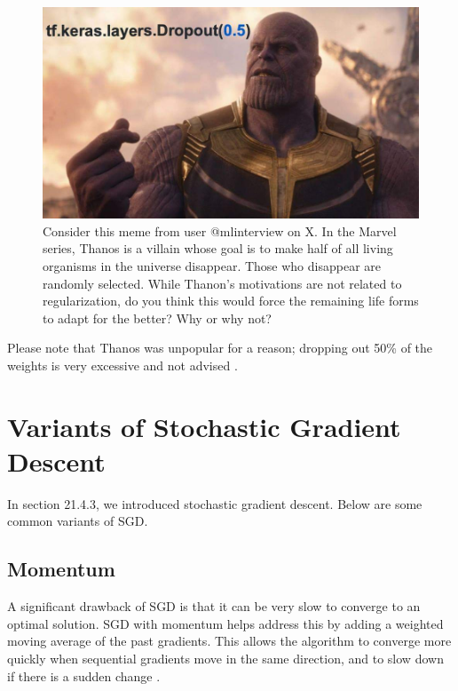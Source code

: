 \documentclass{article}
\begin{document}
\begin{figure}[h]
    \centering
    \includegraphics[scale = 0.24]{dl-figures/thanos-dropout-meme.jpg}
    \caption{Consider this meme from user @mlinterview on X. In the Marvel series, Thanos is a villain whose goal is to make half of all living organisms in the universe disappear. Those who disappear are randomly selected. While Thanon's motivations are not related to regularization, do you think this would force the remaining life forms to adapt for the better? Why or why not?}
    \label{figure:thanos-dropout-meme}
\end{figure}

\FloatBarrier

Please note that Thanos was unpopular for a reason; dropping out 50\% of the weights is very excessive and not advised \cite{tensorflow2015-whitepaper}.

\FloatBarrier

\section{Variants of Stochastic Gradient Descent} %

In section 21.4.3, we introduced stochastic gradient descent. Below are some common variants of SGD.

\subsection{Momentum} %

A significant drawback of SGD is that it can be very slow to converge to an optimal solution. SGD with momentum helps address this by adding a weighted moving average of the past gradients. This allows the algorithm to converge more quickly when sequential gradients move in the same direction, and to slow down if there is a sudden change \cite{pml1book}. 
\end{document}
